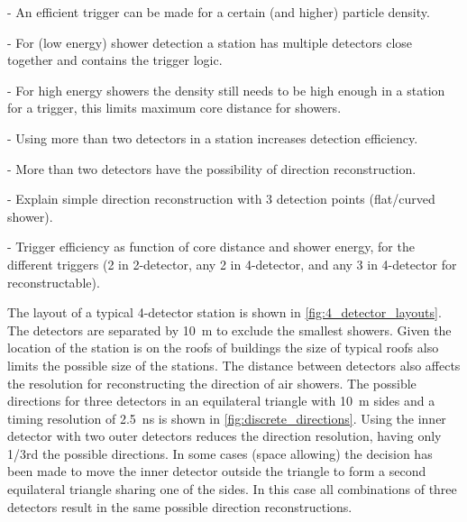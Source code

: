 - An efficient trigger can be made for a certain (and higher) particle density.

- For (low energy) shower detection a station has multiple detectors close together and contains the trigger logic.

- For high energy showers the density still needs to be high enough in a station for a trigger, this limits maximum core distance for showers.

- Using more than two detectors in a station increases detection efficiency.

- More than two detectors have the possibility of direction reconstruction.

- Explain simple direction reconstruction with 3 detection points (flat/curved shower).

- Trigger efficiency as function of core distance and shower energy, for the different triggers (2 in 2-detector, any 2 in 4-detector, and any 3 in 4-detector for reconstructable).

The layout of a typical 4-detector station is shown in \cref{fig:4_detector_layouts}. The detectors are separated by \SI{10}{\meter} to exclude the smallest showers. Given the location of the station is on the roofs of buildings the size of typical roofs also limits the possible size of the stations. The distance between detectors also affects the resolution for reconstructing the direction of air showers. The possible directions for three detectors in an equilateral triangle with \SI{10}{\meter} sides and a timing resolution of \SI{2.5}{\ns} is shown in \cref{fig:discrete_directions}. Using the inner detector with two outer detectors reduces the direction resolution, having only 1/3rd the possible directions. In some cases (space allowing) the decision has been made to move the inner detector outside the triangle to form a second equilateral triangle sharing one of the sides. In this case all combinations of three detectors result in the same possible direction reconstructions.

